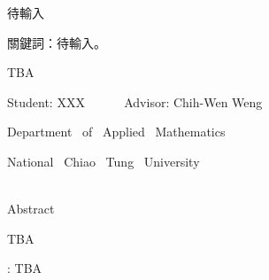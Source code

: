 \documentclass[12pt]{report}%
\renewcommand{\baselinestretch}{1.5} %
\theoremstyle{plain}
\theoremstyle{definition}
\begin{document}
待輸入\\
\bigskip

\noindent 關鍵詞：待輸入。
\pagebreak



\begin{center}{\LARGE
TBA
\bigskip\bigskip\bigskip}

{ \large
Student: XXX  ~~~~~ Advisor: Chih-Wen Weng \\
\Large

Department ~of~ Applied ~Mathematics
\bigskip

National~ Chiao ~Tung~ University
\bigskip\bigskip\bigskip\bigskip}\\
{\large Abstract}
\end{center}


TBA
\bigskip


: TBA
\pagebreak
\renewcommand{\baselinestretch}{1.2}
\large
\tableofcontents


\pagebreak
\end{document}
